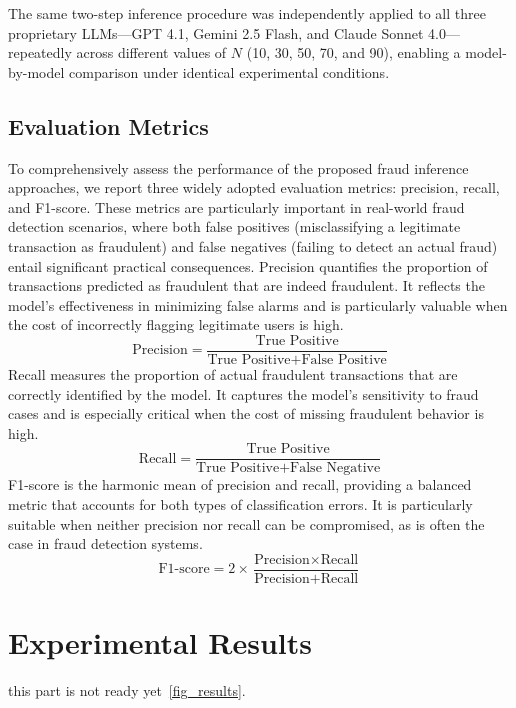 \documentclass[sigconf]{acmart}
\begin{document}
The same two-step inference procedure was independently applied to all three proprietary LLMs—GPT 4.1, Gemini 2.5 Flash, and Claude Sonnet 4.0—repeatedly across different values of $N$ (10, 30, 50, 70, and 90), enabling a model-by-model comparison under identical experimental conditions.





\subsection{Evaluation Metrics}\label{evaluation_metrics}
To comprehensively assess the performance of the proposed fraud inference approaches, we report three widely adopted evaluation metrics: precision, recall, and F1-score. These metrics are particularly important in real-world fraud detection scenarios, where both false positives (misclassifying a legitimate transaction as fraudulent) and false negatives (failing to detect an actual fraud) entail significant practical consequences.
Precision quantifies the proportion of transactions predicted as fraudulent that are indeed fraudulent. It reflects the model's effectiveness in minimizing false alarms and is particularly valuable when the cost of incorrectly flagging legitimate users is high.
\begin{equation}
 \text{Precision} = \frac{\text{True Positive}}{\text{True Positive} + \text{False Positive}}
 \end{equation}
Recall measures the proportion of actual fraudulent transactions that are correctly identified by the model. It captures the model's sensitivity to fraud cases and is especially critical when the cost of missing fraudulent behavior is high.
\begin{equation}
 \text{Recall} = \frac{\text{True Positive}}{\text{True Positive} + \text{False Negative}}
 \end{equation}
F1-score is the harmonic mean of precision and recall, providing a balanced metric that accounts for both types of classification errors. It is particularly suitable when neither precision nor recall can be compromised, as is often the case in fraud detection systems.
\begin{equation}
 \text{F1-score} = 2 \times \frac{\text{Precision} \times \text{Recall}}{\text{Precision} + \text{Recall}}
 \end{equation}




\section{Experimental Results}\label{results}
this part is not ready yet~\ref{fig_results}.
\end{document}
